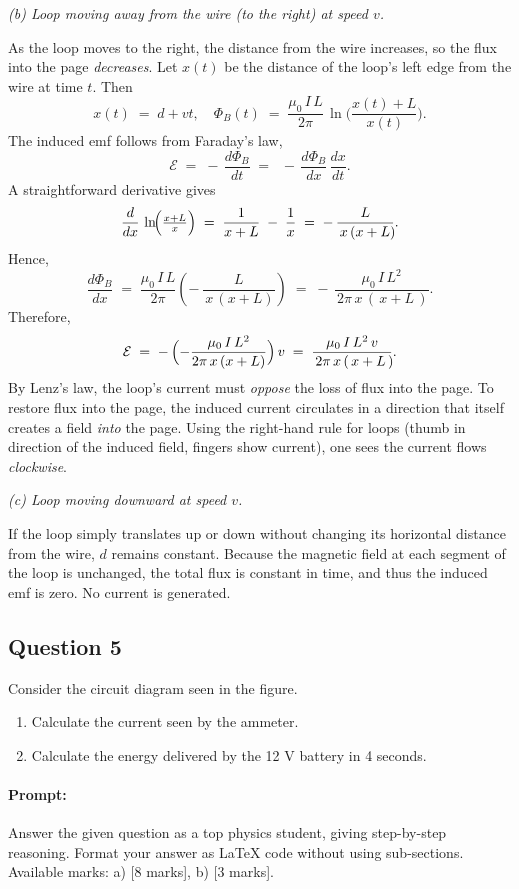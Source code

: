 \documentclass{article}
\begin{document}
\noindent
\emph{(b) Loop moving away from the wire (to the right) at speed $v$.}

As the loop moves to the right, the distance from the wire increases, so the flux into the page \emph{decreases}.  Let $x(t)$ be the distance of the loop's left edge from the wire at time $t$.  Then
\[
x(t) \;=\; d + vt, \quad
\Phi_B(t)
\;=\;
\frac{\mu_0\,I\,L}{2\pi}\,
\ln\!\biggl(\frac{x(t) + L}{\,x(t)\!}\biggr).
\]
The induced emf follows from Faraday's law,
\[
\mathcal{E} \;=\; -\,\frac{d\Phi_B}{dt}
\;=\;\;
-\,\frac{d\Phi_B}{dx}\,\frac{dx}{dt}.
\]
A straightforward derivative gives
\[
\frac{d}{dx}\,
\ln\!\Bigl(\tfrac{x + L}{x}\Bigr)
\;=\;
\frac{1}{x+L}\;-\;\frac{1}{x}
\;=\;
-\,\frac{L}{\,x\,(x+L)\!}.
\]
Hence,
\[
\frac{d\Phi_B}{dx}
\;=\;
\frac{\mu_0\,I\,L}{2\pi}
\left(-\,\frac{L}{\,x\,(x+L)\!}\right)
\;=\;
-\,
\frac{\mu_0\,I\,L^2}{\,2\pi\,x\,(\,x+L\,)\!}.
\]
Therefore,
\[
\mathcal{E}
\;=\;
-\,\Bigl(-\frac{\mu_0\,I\,L^2}{2\pi\,x\,(x+L)}\Bigr)\,v
\;=\;
\frac{\mu_0\,I\,L^2\,v}{\,2\pi\,x\,(\,x+L\,)\!}.
\]
By Lenz's law, the loop's current must \emph{oppose} the loss of flux into the page.  To restore flux into the page, the induced current circulates in a direction that itself creates a field \emph{into} the page.  Using the right-hand rule for loops (thumb in direction of the induced field, fingers show current), one sees the current flows \emph{clockwise}.

\noindent
\emph{(c) Loop moving downward at speed $v$.}

If the loop simply translates up or down without changing its horizontal distance from the wire, $d$ remains constant.  Because the magnetic field at each segment of the loop is unchanged, the total flux is constant in time, and thus the induced emf is zero.  No current is generated.


\subsection{Question 5}
Consider the circuit diagram seen in the figure.
\begin{enumerate}
    \item Calculate the current seen by the ammeter.
    \item Calculate the energy delivered by the 12 V battery in 4 seconds.
\end{enumerate}


\paragraph{Prompt: \\} 
Answer the given question as a top physics student, giving step-by-step reasoning. Format your answer as LaTeX code without using sub-sections. Available marks: a) [8 marks], b) [3 marks].
\end{document}
